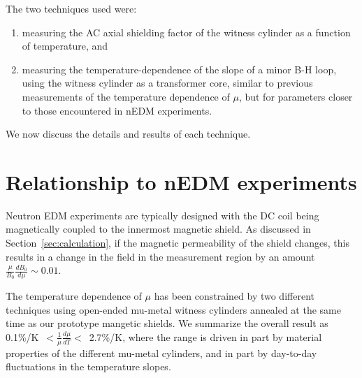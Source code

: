 \documentclass[review]{elsarticle}
\begin{document}
The two techniques used were:
\begin{enumerate}
\item measuring the AC axial shielding factor of the witness cylinder
  as a function of temperature, and
\item measuring the temperature-dependence of the slope of a minor B-H
  loop, using the witness cylinder as a transformer core, similar to
  previous measurements of the temperature dependence of $\mu$, but
  for parameters closer to those encountered in nEDM experiments.
\end{enumerate}
We now discuss the details and results of each technique.







\section{Relationship to nEDM experiments}

Neutron EDM experiments are typically designed with the DC coil being
magnetically coupled to the innermost magnetic shield.  As discussed
in Section~\ref{sec:calculation}, if the magnetic permeability of the
shield changes, this results in a change in the field in the
measurement region by an amount $\frac{\mu}{B_0}\frac{dB_0}{d\mu}\sim
0.01$.

The temperature dependence of $\mu$ has been constrained by two
different techniques using open-ended mu-metal witness cylinders
annealed at the same time as our prototype mangetic shields.  We
summarize the overall result as
0.1\%/K~$<\frac{1}{\mu}\frac{d\mu}{dT}<$~2.7\%/K, where the range is
driven in part by material properties of the different mu-metal
cylinders, and in part by day-to-day fluctuations in the temperature
slopes.
\end{document}
